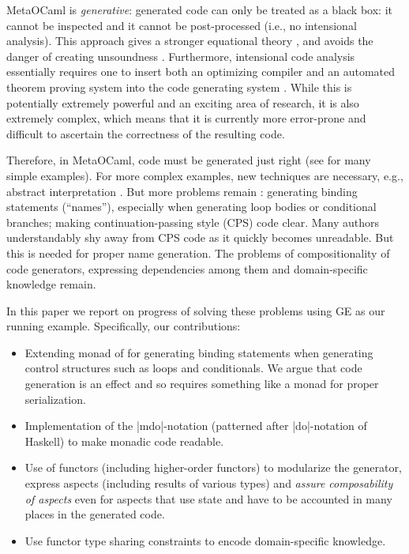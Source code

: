 \documentclass{llncs}
\begin{document}
MetaOCaml is \emph{generative}: generated code can only be treated as
a black box: it cannot be inspected and it cannot be post-processed
(i.e., no intensional analysis). This approach gives a stronger
equational theory \cite{Taha2000}, and avoids the danger of creating
unsoundness \cite{TahaThesis}. Furthermore, intensional code analysis
essentially requires one to insert both an optimizing compiler and an
automated theorem proving system into the code generating system
\cite{Pueschel:05,Kennedy01Telescoping,dongarra7,Veldhuizen:2004}.
While this is potentially extremely powerful and an exciting area of
research, it is also extremely complex, which means that it is
currently more error-prone and difficult to ascertain the correctness
of the resulting code.

Therefore, in MetaOCaml, code must be generated just right (see
\cite{TahaThesis} for many simple examples).  For more complex
examples, new techniques are necessary, e.g., abstract interpretation
\cite{KiselyovTaha}.  But more problems remain
\cite{Padua:MetaOcaml:04}: generating binding statements (``names''),
especially when generating loop bodies or conditional branches; making
continuation-passing style (CPS) code clear.  Many authors
understandably shy away from CPS code as it quickly becomes
unreadable.  But this is needed for proper name generation.
The problems of compositionality of code generators, expressing
dependencies among them and domain-specific knowledge remain.

In this paper we report on progress of solving these problems using GE
as our running example. Specifically, our contributions:
\vspace*{-2pt}
\begin{itemize}
    \item Extending monad of \cite{KiselyovTaha} for generating
      binding statements when generating control structures such as
      loops and conditionals. We argue that code generation is an
      effect and so requires something like a monad for proper
      serialization.
    \item Implementation of the |mdo|-notation (patterned after
      |do|-notation of Haskell) to make monadic code readable.
    \item Use of functors (including higher-order functors) to
      modularize the generator, express aspects (including results of
      various types) and \emph{assure composability of aspects} even
      for aspects that use state and have to be accounted in many
      places in the generated code.
    \item Use functor type sharing constraints to encode domain-specific
      knowledge.
\end{itemize}
\end{document}
